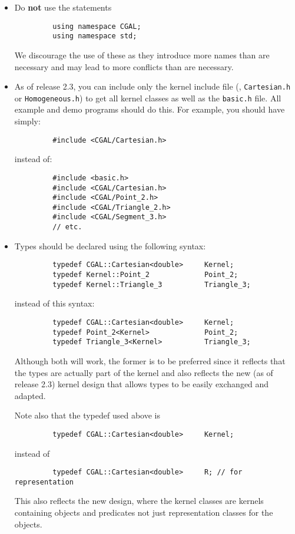 \begin{itemize}
   \item Do \textbf{not} use the statements 
         \begin{verbatim}
         using namespace CGAL;
         using namespace std;
         \end{verbatim}
         We discourage the use of these as they introduce more names than
         are necessary and may lead to more conflicts than are necessary.
   \item As of release 2.3, you can include only the kernel include file
         (\eg, \texttt{Cartesian.h} or \texttt{Homogeneous.h}) to get all
         kernel classes as well as the \texttt{basic.h} file.  All example
         and demo programs should do this.  For example, you should have
         simply:
         \begin{verbatim}
         #include <CGAL/Cartesian.h>
         \end{verbatim}
         instead of:
         \begin{verbatim}
         #include <basic.h>
         #include <CGAL/Cartesian.h>
         #include <CGAL/Point_2.h>
         #include <CGAL/Triangle_2.h>
         #include <CGAL/Segment_3.h>
         // etc.
         \end{verbatim}
   \item Types should be declared using the following syntax:
         \begin{verbatim}
         typedef CGAL::Cartesian<double>     Kernel;
         typedef Kernel::Point_2             Point_2;
         typedef Kernel::Triangle_3          Triangle_3;
         \end{verbatim}
         instead of this syntax:
         \begin{verbatim}
         typedef CGAL::Cartesian<double>     Kernel;
         typedef Point_2<Kernel>             Point_2;
         typedef Triangle_3<Kernel>          Triangle_3;
         \end{verbatim}
         Although both will work, the former is to be preferred since
         it reflects that the types are actually part of the kernel and
         also reflects the new (as of release 2.3) kernel design that allows
         types to be easily exchanged and adapted.  
    
         Note also that the typedef used above is
         \begin{verbatim}
         typedef CGAL::Cartesian<double>     Kernel;
         \end{verbatim}
         instead of
         \begin{verbatim}
         typedef CGAL::Cartesian<double>     R; // for representation
         \end{verbatim}
         This also reflects the new design, where the kernel classes are
         kernels containing objects and predicates not just representation
         classes for the objects.
\end{itemize}

